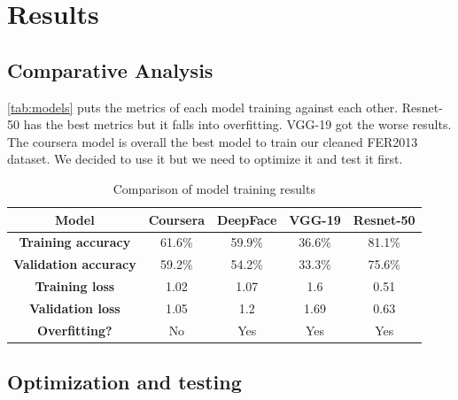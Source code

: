 \documentclass[12pt,a4paper,oneside,english]{book}
\begin{document}
\section{Results}
\subsection{Comparative Analysis}
\autoref{tab:models} puts the metrics of each model training against each other. Resnet-50 has the best metrics but it falls into overfitting. VGG-19 got the worse results. The coursera model is overall the best model to train our cleaned FER2013 dataset. We decided to use it but we need to optimize it and test it first.

\begin{table}[H]
\centering
\begin{tabular}{|c|c|c|c|c|}
\hline
\textbf{Model} & \textbf{Coursera} & \textbf{DeepFace} & \textbf{VGG-19} & \textbf{Resnet-50} \\
\hline
\textbf{Training accuracy} & 61.6\% & 59.9\% & 36.6\% & 81.1\% \\ 
\hline
\textbf{Validation accuracy} & 59.2\% & 54.2\% & 33.3\% & 75.6\%\\ 
\hline
\textbf{Training loss} & 1.02 & 1.07 & 1.6 & 0.51 \\ 
\hline
\textbf{Validation loss} & 1.05 & 1.2 & 1.69 & 0.63 \\
\hline
\textbf{Overfitting?} & \cellcolor{green!25}No & \cellcolor{red!25}Yes & \cellcolor{red!25}Yes & \cellcolor{red!25}Yes \\ 
\hline
\end{tabular}
\caption{Comparison of model training results}
\label{tab:models}
\end{table}

\subsection{Optimization and testing}
\end{document}
